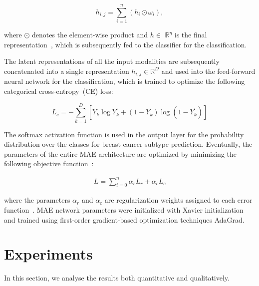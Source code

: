 \begin{equation}
   h_{i,j}=\sum_{i=1}^{n}\left(h_{i} \odot \omega_{i}\right),
\end{equation}

\hspace*{3.5mm} where $\odot$ denotes the element-wise product and $h \in$ $\mathbb{R}^{\eta}$ is the final representation~\cite{mmdcae}, which is subsequently fed to the classifier for the classification. 



The latent representations of all the input modalities are subsequently concatenated into a single representation $h_{i,j} \in \mathbb{R}^{D}$ and used into the feed-forward neural network for the classification, which is trained to optimize the following categorical cross-entropy~(CE) loss: %

\begin{equation} 
    L_{c}=-\sum_{k=1}^{D}\left[Y_{k} \log Y_{k}^{\prime}+\left(1-Y_{k}\right) \log \left(1-Y_{k}^{\prime}\right)\right]
    \label{eq:cross_entropy_loss}
\end{equation} 

\hspace*{3.5mm} The softmax activation function is used in the output layer for the probability distribution over the classes for breast cancer subtype prediction. 
Eventually, the parameters of the entire MAE  architecture are optimized by minimizing the following objective function~\cite{mmdcae}:

\begin{align}
    {L}=\sum_{i=0}^{n} \alpha_{r} {L}_{r}+\alpha_{c} {L}_{c}
    \label{eq:sum}
\end{align}

\hspace*{3.5mm} where the parameters $\alpha_{r}$ and $\alpha_{c}$ are regularization weights assigned to each error function~\cite{mmdcae}. MAE network parameters were initialized with Xavier initialization~\cite{xavier} and trained using first-order gradient-based optimization techniques AdaGrad. 

\section{Experiments}\label{chapter_4:results}
In this section, we analyse the results both quantitative and qualitatively. 

